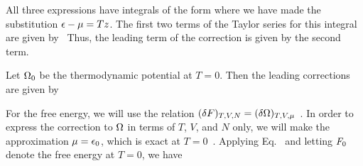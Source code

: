{	All three expressions have integrals of the form
	where we have made the substitution $\epsilon - \mu = T z$.  The first two terms of the Taylor series for this integral are given by~\cite[p.~155]{Landau}
	Thus, the leading term of the correction is given by the second term.
	
	Let $\Omega_0$ be the thermodynamic potential at $T = 0$.  Then the leading corrections are given by
	
	For the free energy, we will use the relation $(\delta F)_{T, V, N} = (\delta \Omega)_{T, V, \mu}$~\cite[pp.~69, 156]{Landau}.  In order to express the correction to $\Omega$ in terms of $T$, $V$, and $N$ only, we will make the approximation $\mu = \epsilon_0$, which is exact at $T = 0$~\cite[p.~153]{Landau}.  Applying Eq.~ and letting $F_0$ denote the free energy at $T = 0$, we have
	
}
